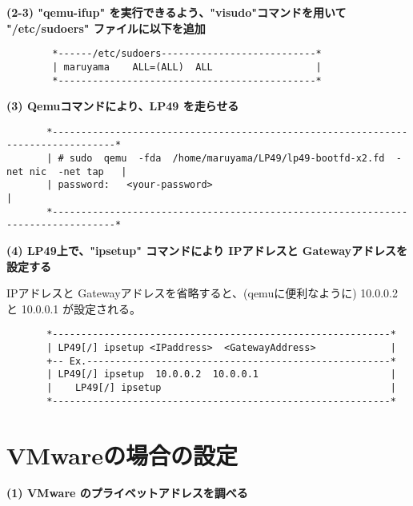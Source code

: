 {\bf  (2-3) "qemu-ifup" を実行できるよう、"visudo"コマンドを用いて "/etc/sudoers" ファイルに以下を追加}\\

\begin{verbatim}
        *------/etc/sudoers---------------------------*                          
        | maruyama    ALL=(ALL)  ALL                  |           
        *---------------------------------------------*                                
\end{verbatim}

{\bf (3)  Qemuコマンドにより、LP49 を走らせる}

\begin{verbatim}
       *---------------------------------------------------------------------------------*
       | # sudo  qemu  -fda  /home/maruyama/LP49/lp49-bootfd-x2.fd  -net nic  -net tap   |
       | password:   <your-password>                                                     |
       *---------------------------------------------------------------------------------* 
\end{verbatim}

{\bf (4)  LP49上で、"ipsetup" コマンドにより IPアドレスと Gatewayアドレスを設定する}

        IPアドレスと Gatewayアドレスを省略すると、(qemuに便利なように) 10.0.0.2 と
         10.0.0.1 が設定される。

\begin{verbatim}
       *-----------------------------------------------------------*
       | LP49[/] ipsetup <IPaddress>  <GatewayAddress>             |
       +-- Ex.-----------------------------------------------------*
       | LP49[/] ipsetup  10.0.0.2  10.0.0.1                       |
       |    LP49[/] ipsetup                                        |
       *-----------------------------------------------------------*
\end{verbatim}


\chapter{VMwareの場合の設定}

{\bf (1) VMware のプライベットアドレスを調べる}

